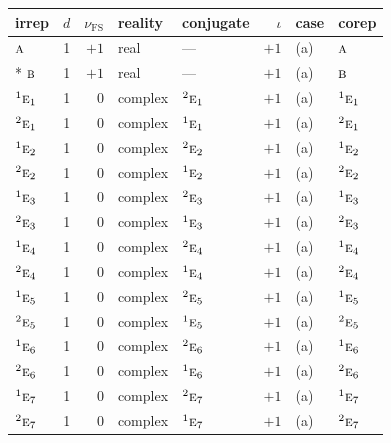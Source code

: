 \documentclass[10pt,a4paper]{article}
\numberwithin{equation}{section}
\newcommand{\irr}[1]{\text{\normalfont\scshape #1}}
\newcommand{\conjpair}[1]{{}^{#1}}
\newcommand{\fsind}{\nu_{\mathrm{FS}}}
\begin{document}
{\small\renewcommand{\arraystretch}{1.25}\setlength{\tabcolsep}{4pt}\begin{longtable}{@{}lrrllrll@{}}\toprule
irrep & $d$ & $\fsind$ & reality & conjugate & $\iota$ & case & corep\\\midrule\endhead
\bottomrule\endfoot\endlastfoot
$\irr{a}$ & 1 & $+1$ & real & --- & $+1$ & (a) & $\irr{a}$\\*
$\irr{b}$ & 1 & $+1$ & real & --- & $+1$ & (a) & $\irr{b}$\\
$\conjpair{1}\irr{e}_{1}$ & 1 & $0$ & complex & $\conjpair{2}\irr{e}_{1}$ & $+1$ & (a) & $\conjpair{1}\irr{e}_{1}$\\
$\conjpair{2}\irr{e}_{1}$ & 1 & $0$ & complex & $\conjpair{1}\irr{e}_{1}$ & $+1$ & (a) & $\conjpair{2}\irr{e}_{1}$\\
$\conjpair{1}\irr{e}_{2}$ & 1 & $0$ & complex & $\conjpair{2}\irr{e}_{2}$ & $+1$ & (a) & $\conjpair{1}\irr{e}_{2}$\\
$\conjpair{2}\irr{e}_{2}$ & 1 & $0$ & complex & $\conjpair{1}\irr{e}_{2}$ & $+1$ & (a) & $\conjpair{2}\irr{e}_{2}$\\
$\conjpair{1}\irr{e}_{3}$ & 1 & $0$ & complex & $\conjpair{2}\irr{e}_{3}$ & $+1$ & (a) & $\conjpair{1}\irr{e}_{3}$\\
$\conjpair{2}\irr{e}_{3}$ & 1 & $0$ & complex & $\conjpair{1}\irr{e}_{3}$ & $+1$ & (a) & $\conjpair{2}\irr{e}_{3}$\\
$\conjpair{1}\irr{e}_{4}$ & 1 & $0$ & complex & $\conjpair{2}\irr{e}_{4}$ & $+1$ & (a) & $\conjpair{1}\irr{e}_{4}$\\
$\conjpair{2}\irr{e}_{4}$ & 1 & $0$ & complex & $\conjpair{1}\irr{e}_{4}$ & $+1$ & (a) & $\conjpair{2}\irr{e}_{4}$\\
$\conjpair{1}\irr{e}_{5}$ & 1 & $0$ & complex & $\conjpair{2}\irr{e}_{5}$ & $+1$ & (a) & $\conjpair{1}\irr{e}_{5}$\\
$\conjpair{2}\irr{e}_{5}$ & 1 & $0$ & complex & $\conjpair{1}\irr{e}_{5}$ & $+1$ & (a) & $\conjpair{2}\irr{e}_{5}$\\
$\conjpair{1}\irr{e}_{6}$ & 1 & $0$ & complex & $\conjpair{2}\irr{e}_{6}$ & $+1$ & (a) & $\conjpair{1}\irr{e}_{6}$\\
$\conjpair{2}\irr{e}_{6}$ & 1 & $0$ & complex & $\conjpair{1}\irr{e}_{6}$ & $+1$ & (a) & $\conjpair{2}\irr{e}_{6}$\\
$\conjpair{1}\irr{e}_{7}$ & 1 & $0$ & complex & $\conjpair{2}\irr{e}_{7}$ & $+1$ & (a) & $\conjpair{1}\irr{e}_{7}$\\
$\conjpair{2}\irr{e}_{7}$ & 1 & $0$ & complex & $\conjpair{1}\irr{e}_{7}$ & $+1$ & (a) & $\conjpair{2}\irr{e}_{7}$\\

\end{longtable}}
\end{document}
